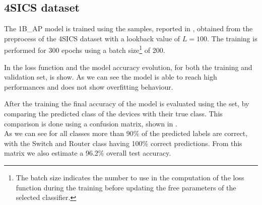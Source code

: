 \subsection{4SICS dataset}
\label{4sics_final_res}

The 1B\_AP model is trained using the samples, reported in , obtained from the preprocess of the 4SICS dataset with a lookback value of $L=100$. The training is performed for 300 epochs using a batch size\footnote{The batch size indicates the number to use in the computation of the loss function during the training before updating the free parameters of the selected classifier.} of 200. 

In  the loss function and the model accuracy evolution, for both the training and validation set, is show. As we can see the model is able to reach high performances and does not show overfitting behaviour. 

After the training the final accuracy of the model is evaluated using the set, by comparing the predicted class of the devices with their true class. This comparison is done using a confusion matrix, shown in .\\
As we can see for all classes more than 90\% of the predicted labels are correct, with the Switch and Router class having 100\% correct predictions. From this matrix we also estimate a 96.2\% overall test accuracy.

